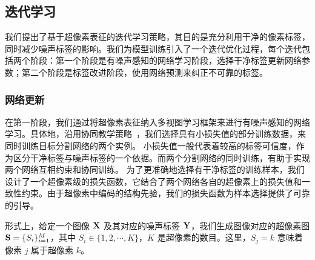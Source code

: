 \subsection{迭代学习} \label{sec:p2_2}
我们提出了基于超像素表征的迭代学习策略，其目的是充分利用干净的像素标签，同时减少噪声标签的影响。我们为模型训练引入了一个迭代优化过程，每个迭代包括两个阶段：第一个阶段是有噪声感知的网络学习阶段，选择干净标签更新网络参数；第二个阶段是标签改进阶段，使用网络预测来纠正不可靠的标签。

\subsubsection{网络更新}

在第一阶段，我们通过将超像素表征纳入多视图学习框架来进行有噪声感知的网络学习。具体地，沿用协同教学策略~\citep{ren2018learning, jiang2018mentornet, Han2018CoteachingRT}，我们选择具有小损失值\citep{arpit2017closer}的部分训练数据，来同时训练目标分割网络的两个实例。
小损失值一般代表着较高的标签可信度，作为区分干净标签与噪声标签的一个依据。而两个分割网络的同时训练，有助于实现两个网络互相约束和协同训练。
为了更准确地选择有干净标签的训练样本，我们设计了一个超像素级的损失函数，它结合了两个网络各自的超像素上的损失值和一致性约束\citep{Wei2020CombatingNL}。由于超像素中编码的结构先验，我们的损失函数为样本选择提供了可靠的引导。

形式上，给定一个图像 $\mathbf{X}$ 及其对应的噪声标签 $\mathbf{Y}$，我们生成图像对应的超像素图 $\mathbf{S} =\{S_i\}_{i=1}^M$，其中 $S_i\in\{1,2,\cdots, K\}$，$K$ 是超像素的数目。这里，$S_j=k$ 意味着像素 $j$ 属于超像素 $k$。

